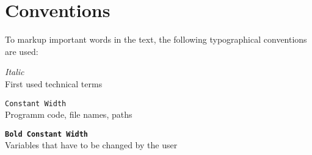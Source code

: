 \section*{Conventions}

To markup important words in the text, the following typographical conventions are used:

\begin{description}
\item \textit{Italic} \hfill \\
  First used technical terms
\item \texttt{Constant Width} \hfill \\
  Programm code, file names, paths
\item \textbf{\texttt{Bold Constant Width}} \hfill \\
  Variables that have to be changed by the user
\end{description}
